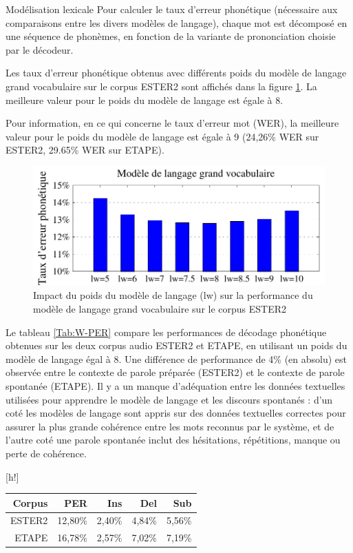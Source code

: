 \documentclass{style/these}
\makeatletter
\renewcommand\familydefault{ptm}
\renewenvironment{table}%
{ \renewcommand{\familydefault}{ptm}\selectfont
  \@float{table}}
  {\end@float}
\makeatother
\begin{document}
\begin{part}{Modélisation lexicale}
Pour calculer le taux d'erreur phonétique (nécessaire aux comparaisons entre les divers modèles de langage), chaque mot est décomposé en une séquence de phonèmes, en fonction de la variante de prononciation choisie par le décodeur. 

Les taux d'erreur phonétique obtenus avec différents poids du modèle de langage grand vocabulaire sur le corpus ESTER2 sont affichés dans la figure \ref{Fig:ML-W-lw-ESTER2}. 
La meilleure valeur pour le poids du modèle de langage est égale à 8. 

Pour information, en ce qui concerne le taux d'erreur mot (\acrshort{WER}), la meilleure valeur pour le poids du modèle de langage est égale à 9 (24,26\% \acrshort{WER} sur ESTER2, 29.65\% \acrshort{WER} sur ETAPE).

\begin{figure}[h!]
\centering
\includegraphics[scale=0.78]{images/results/results_words_lw_ESTER_v2.pdf}
\caption{Impact du poids du modèle de langage (lw) sur la performance du modèle de langage grand vocabulaire sur le corpus ESTER2}
\label{Fig:ML-W-lw-ESTER2}
\end{figure}

Le tableau \ref{Tab:W-PER} compare les performances de décodage phonétique obtenues sur les deux corpus audio ESTER2 et ETAPE, en utilisant un poids du modèle de langage égal à 8. 
Une différence de performance de 4\% (en absolu) est observée entre le contexte de parole préparée (ESTER2) et le contexte de parole spontanée (ETAPE). Il y a un manque d'adéquation entre les données textuelles utilisées pour apprendre le modèle de langage et les discours spontanés : d'un coté les modèles de langage sont appris sur des données textuelles correctes pour assurer la plus grande cohérence entre les mots reconnus par le système, et de l'autre coté une parole spontanée inclut des hésitations, répétitions, manque ou perte de cohérence.   

\begin{table}[h!]
\centering
\begin{tabular}{|r|r|r|r|r|}
\hline
\textbf{Corpus} 	&  \textbf{PER}	&  \textbf{Ins}	& \textbf{Del}	& \textbf{Sub}	\\ \hline
ESTER2			& 12,80\%	& 2,40\%	& 4,84\%	& 5,56\%	\\ \hline
ETAPE			& 16,78\%	& 2,57\%	& 7,02\%	& 7,19\%	\\ \hline
\end{tabular}
\caption{Taux d'erreur phonétique (PER) obtenus avec le modèle de langage grand vocabulaire (basé sur des mots)}
\label{Tab:W-PER}
\end{table}


\end{part}
\end{document}
